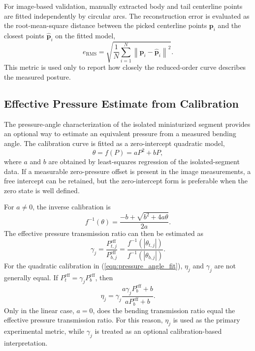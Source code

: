 For image-based validation, manually extracted body and tail centerline points are fitted independently by circular arcs. The reconstruction error is evaluated as the root-mean-square distance between the picked centerline points $\mathbf{p}_i$ and the closest points $\hat{\mathbf{p}}_i$ on the fitted model,
\begin{equation}
  e_{\mathrm{RMS}} =
  \sqrt{
  \frac{1}{N}
  \sum_{i=1}^{N}
  \left\| \mathbf{p}_i-\hat{\mathbf{p}}_i \right\|^2
  }.
  \label{eqn:reconstruction_rmse}
\end{equation}
This metric is used only to report how closely the reduced-order curve describes the measured posture.

\subsection{Effective Pressure Estimate from Calibration}

The pressure-angle characterization of the isolated miniaturized segment provides an optional way to estimate an equivalent pressure from a measured bending angle. The calibration curve is fitted as a zero-intercept quadratic model,
\begin{equation}
  \theta = f(P) = aP^2 + bP,
  \label{eqn:pressure_angle_fit}
\end{equation}
where $a$ and $b$ are obtained by least-squares regression of the isolated-segment data. If a measurable zero-pressure offset is present in the image measurements, a free intercept can be retained, but the zero-intercept form is preferable when the zero state is well defined.

For $a \ne 0$, the inverse calibration is
\begin{equation}
  f^{-1}(\theta)=
  \frac{-b+\sqrt{b^2+4a\theta}}{2a}.
  \label{eqn:inverse_pressure_angle}
\end{equation}
The effective pressure transmission ratio can then be estimated as
\begin{equation}
  \gamma_j =
  \frac{P_{t,j}^{\mathrm{eff}}}{P_{b,j}^{\mathrm{eff}}}
  =
  \frac{f^{-1}(|\theta_{t,j}|)}{f^{-1}(|\theta_{b,j}|)}.
  \label{eqn:effective_pressure_transmission}
\end{equation}
For the quadratic calibration in (\ref{eqn:pressure_angle_fit}), $\eta_j$ and $\gamma_j$ are not generally equal. If $P_t^{\mathrm{eff}}=\gamma_j P_b^{\mathrm{eff}}$, then
\begin{equation}
  \eta_j =
  \gamma_j
  \frac{a\gamma_j P_b^{\mathrm{eff}}+b}
  {aP_b^{\mathrm{eff}}+b}.
  \label{eqn:eta_gamma_relation}
\end{equation}
Only in the linear case, $a=0$, does the bending transmission ratio equal the effective pressure transmission ratio. For this reason, $\eta_j$ is used as the primary experimental metric, while $\gamma_j$ is treated as an optional calibration-based interpretation.

